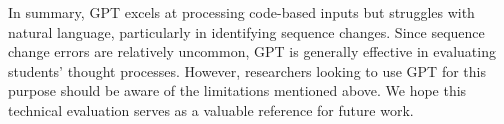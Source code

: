 In summary, GPT excels at processing code-based inputs but struggles with natural language, particularly in identifying sequence changes. Since sequence change errors are relatively uncommon, GPT is generally effective in evaluating students' thought processes. However, researchers looking to use GPT for this purpose should be aware of the limitations mentioned above. We hope this technical evaluation serves as a valuable reference for future work.





